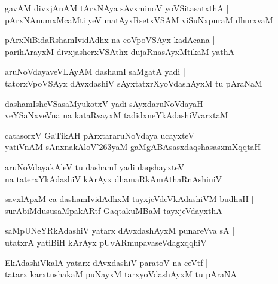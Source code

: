 \begin{shloka}
gavAM divxjAnAM tArxNAya sAvxminoV yoVSitasatxthA |\\
pArxNAnumxMcaMti yeV matAyxRsetxVSAM viSuNxpuraM dhurxvaM 
\end{shloka}

\begin{shloka}
pArxNiBidaRshamIvidAdhx na coVpoVSAyx kadAcana |\\
parihArayxM divxjasherxVSAthx dujaRnasAyxMtikaM yathA
\end{shloka}

\begin{shloka}
aruNoVdayaveVLAyAM dashamI saMgatA yadi |\\
tatorxVpoVSAyx dAvxdashiV sAyxtatxrXyoVdashAyxM tu pAraNaM
\end{shloka}

\begin{shloka}
dashamIsheVSasaMyukotxV yadi sAyxdaruNoVdayaH |\\
veYSaNxveVna na kataRvayxM tadidxneYkAdashiVvarxtaM
\end{shloka}

\begin{shloka}
catasorxV GaTikAH pArxtararuNoVdaya ucayxteV |\\
yatiVnAM sAnxnakAloV\char'263yaM gaMgABAsasxdaqshasasxmXqqtaH
\end{shloka}

\begin{shloka}
aruNoVdayakAleV tu dashamI yadi daqshayxteV |\\
na taterxYkAdashiV kArAyx dhamaRkAmAthaRnAshiniV
\end{shloka}

\begin{shloka}
savxlApxM ca dashamIvidAdhxM tayxjeVdeVkAdashiVM budhaH |\\
surAbiMdususaMpakARtf GaqtakuMBaM tayxjeVdayxthA
\end{shloka}

\begin{shloka}
saMpUNeYRkAdashiV yatarx dAvxdashAyxM punareVva sA |\\
utatxrA yatiBiH kArAyx pUvARmupavaseVdagxqqhiV
\end{shloka}

\begin{shloka}
EkAdashiVkalA yatarx dAvxdashiV paratoV na ceVtf |\\
tatarx karxtushakaM puNayxM tarxyoVdashAyxM tu pAraNA
\end{shloka}

